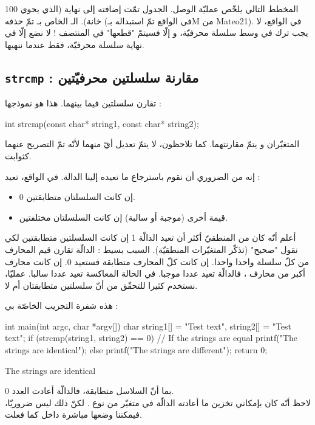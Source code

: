 المخطط التالي يلخّص عمليّة الوصل.
الجدول
تمّت إضافته إلى نهاية
(الذي يحوي 100 خانة).
الـ
الخاص بـ
تمّ حذفه (في الواقع تمّ استبداله بـ\textenglish{M} من \textenglish{Mateo21}). في الواقع، لا يجب ترك
في وسط سلسلة محرفيّة، و إلّا فسيتمّ "قطعها" في المنتصف ! لا نضع
إلّا في نهاية سلسلة محرفيّة، فقط عندما ننهيها.

\subsection{\texttt{strcmp} : مقارنة سلسلتين محرفيّتين}
تقارن سلسلتين فيما بينهما. هذا هو نموذجها :
\begin{Csource}
int strcmp(const char* string1, const char* string2);
\end{Csource}
المتغيّران
و
يتمّ مقارنتهما. كما تلاحظون، لا يتمّ تعديل أيّ منهما لأنّه تمّ التصريح عنهما كثوابت.

إنه من الضروري أن نقوم باسترجاع ما تعيده إلينا الدالة. في الواقع،  تعيد :
\begin{itemize}
  \item 0 إن كانت السلسلتان متطابقتين.
  \item قيمة أخرى (موجبة أو سالبة) إن كانت السلسلتان مختلفتين.
\end{itemize}
\begin{information}
أعلم أنّه كان من المنطقيّ أكثر أن تعيد الدالّة 1 إن كانت السلسلتين متطابقتين لكي نقول "صحيح" (تذكّر المتغيّرات المنطقيّة). السبب بسيط :
الدالّة تقارن قيم المحارف من كلّ سلسلة واحدا واحدا. إن كانت كلّ المحارف متطابقة فستعيد 0. إن كانت محارف
أكبر من محارف
،
فالدالّة تعيد عددا موجبا. في الحالة المعاكسة تعيد عددا سالبا. عمليّا، نستخدم
كثيرا للتحقّق من أنّ سلسلتين متطابقتان أم لا.
\end{information}
هذه شفرة التجريب الخاصّة بي :
\begin{Csource}
int main(int argc, char *argv[])
{
	char string1[] = "Test text", string2[] = "Test text";
	if (strcmp(string1, string2) == 0) // If the strings are equal
	{
    		printf("The strings are identical\n");
 	}
	 else
	{
    		printf("The strings are different\n");
	 }
	return 0;
}
\end{Csource}
\begin{Console}
The strings are identical
\end{Console}
بما أنّ السلاسل متطابقة، فالدالّة
أعادت العدد 0.\\
لاحظ أنّه كان بإمكاني تخزين ما أعادته الدالّة في متغيّر من نوع
.
لكنّ ذلك ليس ضروريّا، فيمكننا وضعها مباشرة داخل
كما فعلت.

